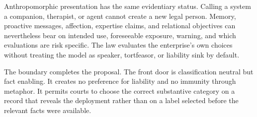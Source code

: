 Anthropomorphic presentation has the same evidentiary status. Calling a system a companion, therapist, or agent cannot create a new legal person. Memory, proactive messages, affection, expertise claims, and relational objectives can nevertheless bear on intended use, foreseeable exposure, warning, and which evaluations are risk specific. The law evaluates the enterprise's own choices without treating the model as speaker, tortfeasor, or liability sink by default.

The boundary completes the proposal. The front door is classification neutral but fact enabling. It creates no preference for liability and no immunity through metaphor. It permits courts to choose the correct substantive category on a record that reveals the deployment rather than on a label selected before the relevant facts were available.
